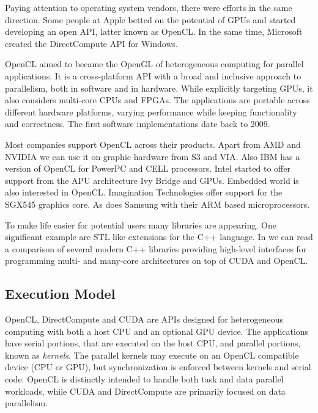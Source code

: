 \documentclass{comjnl}
\begin{document}
Paying attention to operating system vendors, there were efforts in the same direction. Some people at Apple betted on the potential of GPUs and started developing an open API, latter known as OpenCL. In the same time, Microsoft created the DirectCompute API for Windows.

OpenCL aimed to became the OpenGL of heterogeneous computing for parallel applications. It is a cross-platform API with a broad and inclusive approach to parallelism, both in software and in hardware. While explicitly targeting GPUs, it also considers multi-core CPUs and FPGAs. The applications are portable across different hardware platforms, varying performance while keeping functionality and correctness. The first software implementations date back to 2009.

Most companies support OpenCL across their products. Apart from AMD and NVIDIA we can use it on graphic hardware from S3 and VIA. Also IBM has a version of OpenCL for PowerPC and CELL processors. Intel started to offer support from the APU architecture Ivy Bridge and GPUs. Embedded world is also interested in OpenCL. Imagination Technologies offer support for the SGX545 graphics core. As does Samsung with their ARM based microprocessors.

To make life easier for potential users many libraries are appearing. One significant example are STL like extensions for the C++ language. In \cite{doi:10.1137/120903683} we can read a comparison of several modern C++ libraries providing high-level interfaces for programming multi- and many-core architectures on top of CUDA and OpenCL.

\subsection{Execution Model}

OpenCL, DirectCompute and CUDA are APIs designed for heterogeneous computing with both a host CPU and an optional GPU device. The applications have serial portions, that are executed on the host CPU, and parallel portions, known as \textit{kernels}. The parallel kernels may execute on an OpenCL compatible device (CPU or GPU), but synchronization is enforced between kernels and serial code. OpenCL is distinctly intended to handle both task and data parallel workloads, while CUDA and DirectCompute are primarily focused on data parallelism. 
\end{document}
